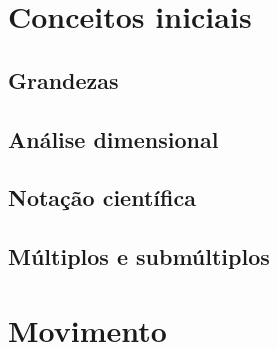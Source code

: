 \documentclass{beamer}
\begin{document}
\section{Conceitos iniciais}
%
\subsection{Grandezas}
%
\subsection{Análise dimensional}
%
\subsection{Notação científica}
%
\subsection{Múltiplos e submúltiplos}
\section{Movimento}
\end{document}
